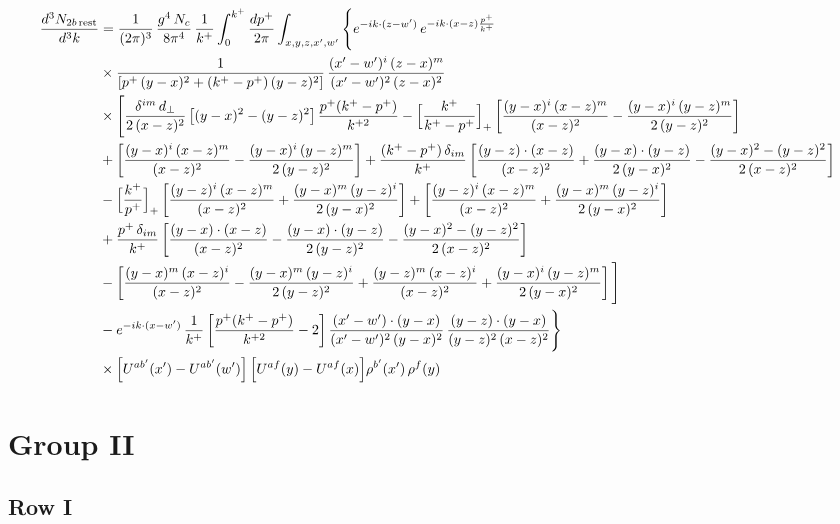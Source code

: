 \documentclass[9pt]{article}
\numberwithin{equation}{section}
\begin{document}
\begin{align}
\frac{d^{3}N_{2b\,\rm rest}}{d^{3}k} & =\frac{1}{(2\pi)^{3}}\,\frac{g^{4}\,N_{c}}{8\pi^{4}}\,\frac{1}{k^{+}}\int_{0}^{k^{+}}\frac{dp^{+}}{2\pi}\int_{x,y,z,x',w'}\Bigg\{e^{-ik\cdot(z-w')}\,e^{-ik\cdot(x-z)\frac{p^{+}}{k^{+}}}\notag \\ & \times\frac{1}{\left[p^{+}\,(y-x)^{2}+(k^{+}-p^{+})\,(y-z)^{2}\right]}\,\frac{(x'-w')^{i}\,(z-x)^{m}}{(x'-w')^{2}\,(z-x)^{2}}\notag\\
&\times\Bigg[\frac{\delta^{im}\,d_{\perp}}{2\,(x-z)^{2}}\left[(y-x)^{2}-(y-z)^{2}\right]\frac{p^{+}(k^{+}-p^{+})}{k^{+2}}
-\Big[\frac{k^{+}}{k^{+}-p^{+}}\Big]_{+}\left[\frac{(y-x)^{i}\,(x-z)^{m}}{(x-z)^{2}}-\frac{(y-x)^{i}\,(y-z)^{m}}{2\,(y-z)^{2}}\right]\notag\\
&+\left[\frac{(y-x)^{i}\,(x-z)^{m}}{(x-z)^{2}}-\frac{(y-x)^{i}\,(y-z)^{m}}{2\,(y-z)^{2}}\right]
+\frac{(k^{+}-p^{+})\,\delta_{im}}{k^{+}}\left[\frac{(y-z)\cdot(x-z)}{(x-z)^{2}}+\frac{(y-x)\cdot(y-z)}{2\,(y-x)^{2}}-\frac{(y-x)^{2}-(y-z)^{2}}{2\,(x-z)^{2}}\right]\notag\\
&-\Big[\frac{k^{+}}{p^{+}}\Big]_{+}\left[\frac{(y-z)^{i}\,(x-z)^{m}}{(x-z)^{2}}+\frac{(y-x)^{m}\,(y-z)^{i}}{2\,(y-x)^{2}}\right]+\left[\frac{(y-z)^{i}\,(x-z)^{m}}{(x-z)^{2}}+\frac{(y-x)^{m}\,(y-z)^{i}}{2\,(y-x)^{2}}\right]\notag\\
&+\frac{p^{+}\,\delta_{im}}{k^{+}}\left[\frac{(y-x)\cdot(x-z)}{(x-z)^{2}}-\frac{(y-x)\cdot(y-z)}{2\,(y-z)^{2}}-\frac{(y-x)^{2}-(y-z)^{2}}{2\,(x-z)^{2}}\right]\notag\\
&-\left[\frac{(y-x)^{m}\,(x-z)^{i}}{(x-z)^{2}}-\frac{(y-x)^{m}\,(y-z)^{i}}{2\,(y-z)^{2}}+\frac{(y-z)^{m}\,(x-z)^{i}}{(x-z)^{2}}+\frac{(y-x)^{i}\,(y-z)^{m}}{2\,(y-x)^{2}}\right]\Bigg]\notag\\
&-e^{-ik\cdot(x-w')}\,\frac{1}{k^{+}}\left[\frac{p^{+}(k^{+}-p^{+})}{k^{+2}}-2\right]\frac{(x'-w')\cdot(y-x)}{(x'-w')^{2}\,(y-x)^{2}}\,\frac{(y-z)\cdot(y-x)}{(y-z)^{2}\,(x-z)^{2}}\Bigg\}\notag\\
&\times\Big[U^{ab'}(x')-U^{ab'}(w')\Big]\,\Big[U^{af}(y)-U^{af}(x)\Big]\rho^{b'}(x')\,\rho^{f}(y)
\end{align}
\section{Group II}
\subsection{Row I}
\end{document}
